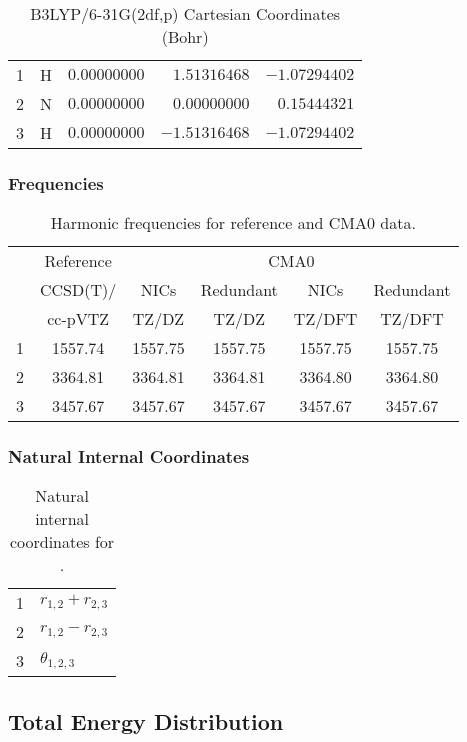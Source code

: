 \documentclass[10pt,oneside]{article}
\begin{document}
\begin{table}[h]
\centering
\caption{B3LYP/6-31G(2df,p) Cartesian Coordinates (Bohr)}
\begin{tabular}{llrrr}
\toprule
1  & H  & $ 0.00000000$ & $ 1.51316468$ & $-1.07294402$ \\
2  & N  & $ 0.00000000$ & $ 0.00000000$ & $ 0.15444321$ \\
3  & H  & $ 0.00000000$ & $-1.51316468$ & $-1.07294402$ \\
\bottomrule
\end{tabular}
\end{table}

\begin{table}[h!]
\subsubsection*{Frequencies}
\centering
\caption{Harmonic frequencies for reference and CMA0 data.}
\begin{tabular}{cccccc}
\toprule
{} & Reference & \multicolumn{4}{c}{CMA0} \\
{} &  CCSD(T)/ &    NICs &  Redundant &    NICs & Redundant \\
{} &   cc-pVTZ &   TZ/DZ &      TZ/DZ &  TZ/DFT &    TZ/DFT \\
\midrule
1 &   1557.74 & 1557.75 &    1557.75 & 1557.75 &   1557.75 \\
2 &   3364.81 & 3364.81 &    3364.81 & 3364.80 &   3364.80 \\
3 &   3457.67 & 3457.67 &    3457.67 & 3457.67 &   3457.67 \\
\bottomrule
\end{tabular}
\end{table}

\begin{table}[h!]
\subsubsection*{Natural Internal Coordinates}
\centering
\caption{Natural internal coordinates for .}
\small
\begin{tabular}{ll}
\toprule
  1   & $r_{1,2} + r_{2,3}$ \\
  2   & $r_{1,2} - r_{2,3}$ \\
  3   & $\theta_{1,2,3}$ \\
\bottomrule
\end{tabular}
\end{table}

\begin{table}
\subsection*{Total Energy Distribution}
\centering\end{table}
\end{document}
